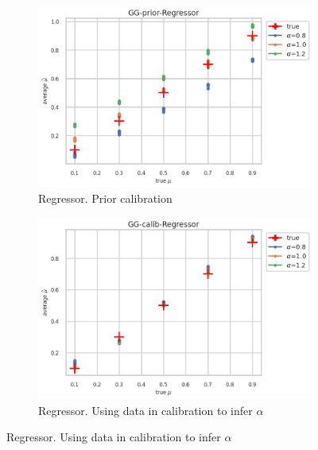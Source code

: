 \begin{figure}[ht!]
  \centering
  \begin{subfigure}[t]{0.49\linewidth}
    \includegraphics[width=\linewidth]{COMPARE/GG-prior/Regressor/profusion_true_mu_target_mean.png}
    \caption{Regressor. Prior calibration}
  \end{subfigure}%
  \hfill
  \begin{subfigure}[t]{0.49\linewidth}
    \includegraphics[width=\linewidth]{COMPARE/GG-calib/Regressor/profusion_true_mu_target_mean.png}
    \caption{Regressor. Using data in calibration to infer $\alpha$}
  \end{subfigure}


\end{figure}
